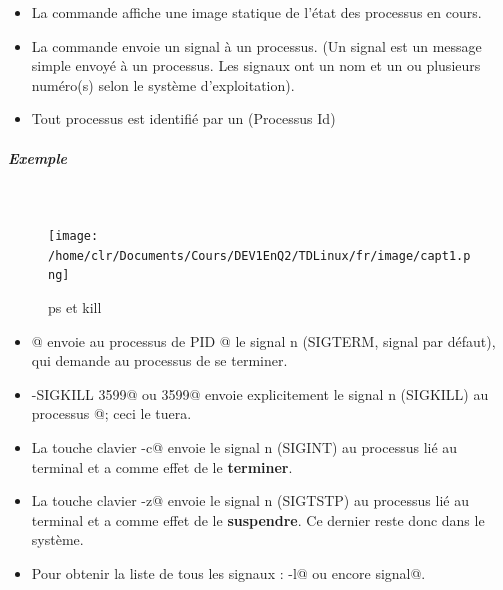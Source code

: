\documentclass[11pt,a4paper]{article}
\begin{document}
			\begin{boxedminipage}[h]{\linewidth}
		
					\begin{itemize}
				
			\item 
						La commande \verb@ps@
						affiche une image statique de l'\'etat des processus en cours.
					
			\item 
						La commande \verb@kill@
						envoie un signal \`a un processus.
						(Un signal est un message simple envoy\'e \`a un processus.
						Les signaux ont un nom et un ou plusieurs num\'ero(s)
						selon le syst\`eme d'exploitation).
					
			\item 
						Tout processus est identifi\'e par un
						\verb@PID@ (Processus Id)
					\end{itemize}
				
			\end{boxedminipage}

			
		\subparagraph{Exemple} 
		
					\textcolor{white}{.} \par
				
            \par
        \begin{figure}[hbt]
				    \begin{center}
					\texttt{[image: /home/clr/Documents/Cours/DEV1EnQ2/TDLinux/fr/image/capt1.png]}
						\end{center}
                
                    \caption[ps et kill]{ps et kill}
                \end{figure}
                    
					\begin{itemize}
				
			\item {}@
						envoie au processus de PID 
						@
						le signal n (SIGTERM, signal par d\'efaut),
						qui demande au processus de se terminer.
					
			\item \verb@kill -SIGKILL 3599@ 
						ou  3599@
						envoie explicitement le signal n (SIGKILL) au processus 
						@; ceci le tuera.
					
			\item 
						La touche clavier \verb@Ctrl-c@
						envoie le signal n (SIGINT) au processus li\'e au terminal
						et a comme effet de le
						\textbf{terminer}.
					
			\item 
						La touche clavier \verb@Ctrl-z@
						envoie le signal n (SIGTSTP) au processus li\'e au terminal
						et a comme effet de le 
						\textbf{suspendre}.
						Ce dernier reste donc dans le syst\`eme.
					
			\item 
						Pour obtenir la liste de tous les signaux :
						\verb@kill -l@ ou 
						encore  signal@.
					
					\end{itemize}
				
\end{document}
